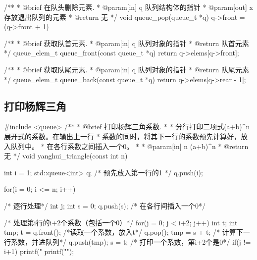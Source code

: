 \begin{Codex}[label=queue.c]
/**
  * @brief 在队头删除元素.
  * @param[in] q 队列结构体的指针
  * @param[out] x 存放退出队列的元素
  * @return 无
  */
void queue_pop(queue_t *q) {
    q->front = (q->front + 1) %
}

/**
 * @brief 获取队首元素.
 * @param[in] q 队列对象的指针
 * @return 队首元素
 */
queue_elem_t queue_front(const queue_t *q) {
    return q->elems[q->front];
}

/**
 * @brief 获取队尾元素.
 * @param[in] q 队列对象的指针
 * @return 队尾元素
 */
queue_elem_t queue_back(const queue_t *q) {
    return q->elems[q->rear - 1];
}
\end{Codex}

\subsection{打印杨辉三角}

\begin{Codex}[label=yanghui_triangle.cpp]
#include <queue>
/**
 * @brief 打印杨辉三角系数.
 *
 * 分行打印二项式(a+b)^n展开式的系数。在输出上一行
 * 系数的同时，将其下一行的系数预先计算好，放入队列中。
 * 在各行系数之间插入一个0。
 *
 * @param[in] n (a+b)^n
 * @return 无
 */
void yanghui_triangle(const int n) {
    int i = 1;
    std::queue<int> q;
    /* 预先放入第一行的1 */
    q.push(i);

    for(i = 0; i <= n; i++) {     /* 逐行处理*/
        int j;
        int s = 0;
        q.push(s);      /* 在各行间插入一个0*/

        /* 处理第i行的i+2个系数（包括一个0）*/
        for(j = 0; j < i+2; j++) {
            int t;
            int tmp;
            t = q.front();  /*读取一个系数，放入t*/
            q.pop();
            tmp = s + t;      /* 计算下一行系数，并进队列*/
            q.push(tmp);
            s = t;            /* 打印一个系数，第i+2个是0*/
            if(j != i+1) {
                printf("%
            }
        }
        printf("\n"); 
    }
}
\end{Codex}
